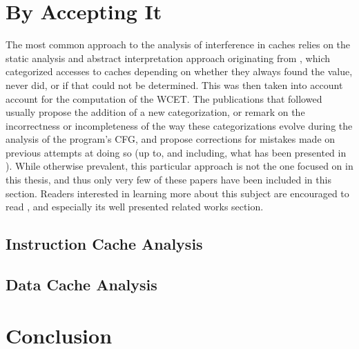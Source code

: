 \section{By Accepting It}
\label{sec:rel_work:handling_it:accepting_it}
The most common approach to the analysis of interference in caches relies on
the static analysis and abstract interpretation approach originating from
\cite{10.1023/A:1008186323068}, which categorized accesses to caches depending
on whether they always found the value, never did, or if that could not be
determined. This was then taken into account account for the computation of the
WCET. The publications that followed usually propose the addition of a new
categorization, or remark on the incorrectness or incompleteness of the way
these categorizations evolve during the analysis of the program's CFG, and
propose corrections for mistakes made on previous attempts at doing so (up to,
and including, what has been presented in \cite{10.1023/A:1008186323068}).
While otherwise prevalent, this particular approach is not the one focused on in
this thesis, and thus only very few of these papers have been included in this
section. Readers interested in learning more about this subject are encouraged
to read \cite{10.1145/3290367}, and especially its well presented related works
section.

\subsection{Instruction Cache Analysis}






\stopallthesefloats
\subsection{Data Cache Analysis}




\stopallthesefloats
\section{Conclusion}

